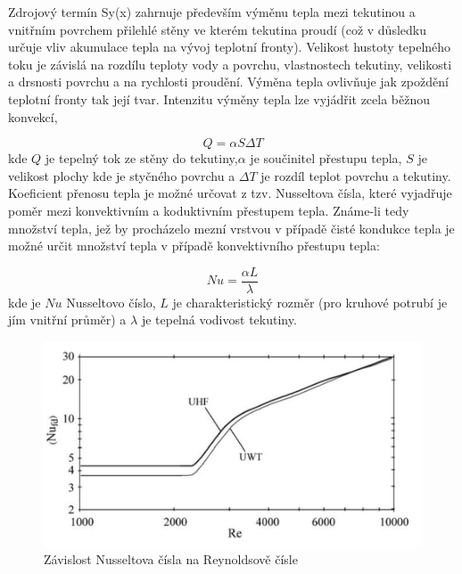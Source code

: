 Zdrojový termín Sy(x) zahrnuje především výměnu tepla mezi tekutinou a vnitřním
povrchem přilehlé stěny ve kterém tekutina proudí (což v důsledku určuje vliv
akumulace tepla na vývoj teplotní fronty). Velikost hustoty tepelného toku je
závislá na rozdílu teploty vody a povrchu, vlastnostech tekutiny, velikosti a
drsnosti povrchu a na rychlosti proudění. Výměna tepla ovlivňuje jak zpoždění
teplotní fronty tak její tvar. Intenzitu výměny tepla lze vyjádřit zcela běžnou
konvekcí,

\begin{equation} 
Q = \alpha S \Delta T 
\end{equation}
kde \(Q\) je tepelný tok ze stěny do tekutiny,\(\alpha\) je součinitel přestupu
tepla, \(S\) je velikost plochy kde je styčného povrchu a \(\Delta T\) je 
rozdíl teplot povrchu a tekutiny. Koeficient přenosu tepla  je možné určovat z
tzv. Nusseltova čísla, které vyjadřuje poměr mezi konvektivním a koduktivním 
přestupem tepla. Známe-li tedy množství tepla, jež by procházelo mezní vrstvou 
v případě čisté kondukce tepla je možné určit množství tepla v případě 
konvektivního přestupu tepla:

\begin{equation} 
Nu = \frac{\alpha L}{\lambda} 
\end{equation}
kde je \(Nu\) Nusseltovo číslo, \(L\) je charakteristický rozměr (pro kruhové 
potrubí je jím vnitřní průměr) a \(\lambda\) je tepelná vodivost tekutiny.

\begin{figure}[h] \centering \capstart
\includegraphics[scale=0.3]{figures/nusselt}
\caption{Závislost Nusseltova čísla na Reynoldsově čísle \cite{Abraham2009}}
\end{figure}

